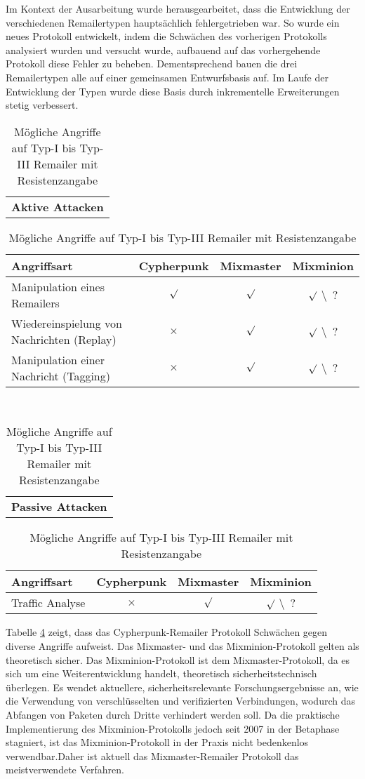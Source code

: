 Im Kontext der Ausarbeitung wurde herausgearbeitet, dass die Entwicklung der verschiedenen Remailertypen hauptsächlich fehlergetrieben war. So wurde ein neues Protokoll entwickelt, indem die Schwächen des vorherigen Protokolls analysiert wurden und versucht wurde, aufbauend auf das vorhergehende Protokoll diese Fehler zu beheben. Dementsprechend bauen die drei Remailertypen alle auf einer gemeinsamen Entwurfsbasis auf. Im Laufe der Entwicklung der Typen wurde diese Basis durch inkrementelle Erweiterungen stetig verbessert.

\clearpage

\begin{table}[htbp]
	\centering
	\begin{tabular}{c}
		\textbf{Aktive Attacken}
	\end{tabular}
		
	\begin{tabular}{m{7.5cm} || c | c | c}
		\hline
		\textbf{Angriffsart} & \textbf{Cypherpunk} & \textbf{Mixmaster} & \textbf{Mixminion} \\
		\hline
		Manipulation eines Remailers & $\surd$ & $\surd$ & $\surd$ \textbackslash ~? \\
		Wiedereinspielung von Nachrichten (Replay) & $\times$ & $\surd$ & $\surd$ \textbackslash ~? \\
		Manipulation einer Nachricht (Tagging) & $\times$ & $\surd$ & $\surd$ \textbackslash ~? \\
	\end{tabular}

	~\\[1ex]

	\begin{tabular}{c}
		\textbf{Passive Attacken}
	\end{tabular}
	
	\begin{tabular}{m{7.5cm} || c | c | c}
		\hline
		\textbf{Angriffsart} & \textbf{Cypherpunk} & \textbf{Mixmaster} & \textbf{Mixminion} \\
		\hline
		Traffic Analyse & $\times$ & $\surd$ & $\surd$ \textbackslash ~? \\
	\end{tabular}

	\caption{Mögliche Angriffe auf Typ-I bis Typ-III Remailer mit Resistenzangabe}
	\label{attacks}
\end{table}

Tabelle \ref{attacks} zeigt, dass das Cypherpunk-Remailer Protokoll Schwächen gegen diverse Angriffe aufweist. Das Mixmaster- und das Mixminion-Protokoll gelten als theoretisch sicher. Das Mixminion-Protokoll ist dem Mixmaster-Protokoll, da es sich um eine Weiterentwicklung handelt, theoretisch sicherheitstechnisch überlegen. Es wendet aktuellere, sicherheitsrelevante Forschungsergebnisse an, wie die Verwendung von verschlüsselten und verifizierten Verbindungen, wodurch das Abfangen von Paketen durch Dritte verhindert werden soll. Da die praktische Implementierung des Mixminion-Protokolls jedoch seit 2007 in der Betaphase stagniert, ist das Mixminion-Protokoll in der Praxis nicht bedenkenlos verwendbar.Daher ist aktuell das Mixmaster-Remailer Protokoll das meistverwendete Verfahren. 

